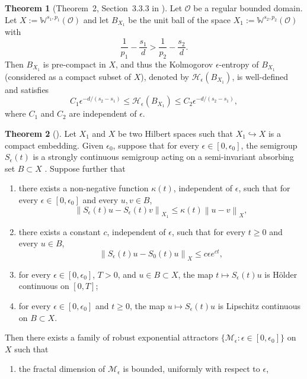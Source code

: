 \documentclass[11pt, reqno]{amsart}
\theoremstyle{definition}
\newtheorem{theorem}{Theorem}[section]
\numberwithin{equation}{section}
\newcommand{\bb}{\mathbb}
\newcommand{\norm}[2]{\left\|{#1}\right\|_{#2}}
\begin{document}
\begin{theorem}[Theorem~2, Section~3.3.3 in \cite{EdmTri96}]\label{the:embed}
Let $\mathscr{O}$ be a regular bounded domain. Let $X:= \bb{W}^{s_1,p_1}(\mathscr{O})$ and let $B_{X_1}$ be the unit ball of the space $X_1:= \bb{W}^{s_2,p_2}(\mathscr{O})$ with
\[
    \frac{1}{p_1} - \frac{s_1}{d} > \frac{1}{p_2} - \frac{s_2}{d}.
\]
Then $B_{X_1}$ is pre-compact in $X$, and thus the Kolmogorov $\epsilon$-entropy of $B_{X_1}$ (considered as a compact subset of $X$), denoted by $\mathcal{H}_\epsilon (B_{X_1})$, is well-defined and satisfies
\[
    C_1 \epsilon^{-d/(s_2-s_1)} \leq \mathcal{H}_\epsilon (B_{X_1})
    \leq
    C_2 \epsilon^{-d/(s_2-s_1)},
\]
where $C_1$ and $C_2$ are independent of $\epsilon$.
\end{theorem}

\begin{theorem}[\cite{EfeMirZel04, MirZel08}]\label{the:robust exp}
Let $X_1$ and $X$ be two Hilbert spaces such that $X_1\hookrightarrow X$ is a compact embedding. Given $\epsilon_0$, suppose that for every $\epsilon\in [0,\epsilon_0]$, the semigroup $S_\epsilon(t)$ is a strongly continuous semigroup acting on a semi-invariant absorbing set $B\subset X$ . Suppose further that
\begin{enumerate}
    \item there exists a non-negative function $\kappa(t)$, independent of $\epsilon$, such that for every $\epsilon\in [0,\epsilon_0]$ and every $u,v\in B$,
    \[
        \norm{S_\epsilon(t) u -S_\epsilon(t) v}{X_1}
        \leq
        \kappa(t) \norm{u-v}{X},
    \]
    \item there exists a constant $c$, independent of $\epsilon$, such that for every $t\geq 0$ and every $u\in B$,
    \[
        \norm{S_\epsilon(t) u- S_0(t) u}{X} \leq
        c \epsilon e^{ct},
    \]
    \item for every $\epsilon\in [0,\epsilon_0]$, $T>0$, and $u\in B\subset X$, the map $t\mapsto S_\epsilon (t) u$ is H\"older continuous on $[0,T]$;
    \item for every $\epsilon \in [0,\epsilon_0]$ and $t\geq 0$, the map $u \mapsto S_\epsilon(t) u$ is Lipschitz continuous on $B\subset X$.
\end{enumerate}
Then there exists a family of robust exponential attractors $\{\mathcal{M}_\epsilon: \epsilon\in [0,\epsilon_0]\}$ on $X$ such that
\begin{enumerate}
    \item the fractal dimension of $\mathcal{M}_\epsilon$ is bounded, uniformly with respect to $\epsilon$,

\end{enumerate}
\end{theorem}
\end{document}
